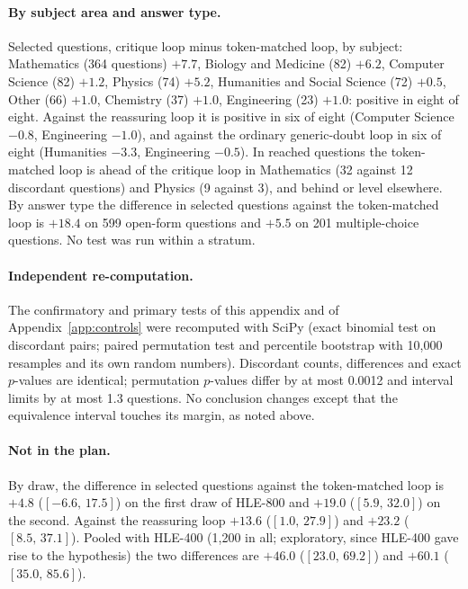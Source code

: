 \documentclass[11pt]{article}
\newcommand{\ci}[2]{$[#1,\,#2]$}
\begin{document}
\paragraph{By subject area and answer type.}
Selected questions, critique loop minus token-matched loop, by subject: Mathematics (364 questions) $+7.7$, Biology and Medicine (82) $+6.2$, Computer Science (82) $+1.2$, Physics (74) $+5.2$, Humanities and Social Science (72) $+0.5$, Other (66) $+1.0$, Chemistry (37) $+1.0$, Engineering (23) $+1.0$: positive in eight of eight.
Against the reassuring loop it is positive in six of eight (Computer Science $-0.8$, Engineering $-1.0$), and against the ordinary generic-doubt loop in six of eight (Humanities $-3.3$, Engineering $-0.5$).
In reached questions the token-matched loop is ahead of the critique loop in Mathematics (32 against 12 discordant questions) and Physics (9 against 3), and behind or level elsewhere.
By answer type the difference in selected questions against the token-matched loop is $+18.4$ on 599 open-form questions and $+5.5$ on 201 multiple-choice questions.
No test was run within a stratum.

\paragraph{Independent re-computation.}
The confirmatory and primary tests of this appendix and of Appendix~\ref{app:controls} were recomputed with SciPy (exact binomial test on discordant pairs; paired permutation test and percentile bootstrap with 10,000 resamples and its own random numbers).
Discordant counts, differences and exact $p$-values are identical; permutation $p$-values differ by at most 0.0012 and interval limits by at most 1.3 questions.
No conclusion changes except that the equivalence interval touches its margin, as noted above.

\paragraph{Not in the plan.}
By draw, the difference in selected questions against the token-matched loop is $+4.8$ (\ci{-6.6}{17.5}) on the first draw of HLE-800 and $+19.0$ (\ci{5.9}{32.0}) on the second. Against the reassuring loop $+13.6$ (\ci{1.0}{27.9}) and $+23.2$ (\ci{8.5}{37.1}).
Pooled with HLE-400 (1,200 in all; exploratory, since HLE-400 gave rise to the hypothesis) the two differences are $+46.0$ (\ci{23.0}{69.2}) and $+60.1$ (\ci{35.0}{85.6}).
\end{document}
